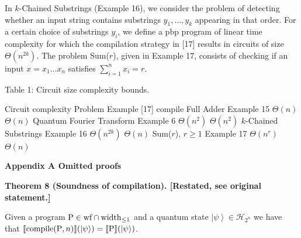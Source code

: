  
 
In $k$-Chained Substrings (Example 16), we consider the problem of detecting whether an input string contains substrings $y_{1},\dots,y_{k}$ appearing in that order. For a certain choice of substrings $y_{i}$, we define a pbp program of linear time complexity for which the compilation strategy in [17] results in circuits of size $\Theta(n^{2k})$. The problem Sum($r$), given in Example 17, consists of checking if an input $x=x_{1}\dots x_{n}$ satisfies $\sum_{i=1}^{n}x_{i}=r$.\par
 
 
 
Table 1: Circuit size complexity bounds.\par
     Circuit complexity     Problem   Example     [17]     compile     Full Adder   Example 15     $\Theta(n)$     $\Theta(n)$     Quantum Fourier Transform   Example 6     $\Theta(n^{2})$     $\Theta(n^{2})$      $k$-Chained Substrings   Example 16     $\Theta(n^{2k})$     $\Theta(n)$     Sum($r$), $r\geq 1$    Example 17     $\Theta(n^{r})$     $\Theta(n)$      
 
 


 
\par\medskip\noindent\textbf{Appendix A Omitted proofs}\par
 
 
 
\par\medskip\noindent\textbf{Theorem 8 (Soundness of compilation). [Restated, see original statement.]}\par
 
 
Given a program $\mathrm{P}\in\textnormal{{wf}}\cap\textnormal{{width}}_{\leq 1}$ and a quantum state $\left|\psi\right\rangle\in\mathcal{H}_{2^{n}}$ we have that $\llbracket\textnormal{{compile}}{}(\mathrm{P},n)\rrbracket(\left|\psi\right%
\rangle)=\llbracket\mathrm{P}\rrbracket(\left|\psi\right\rangle)$.\par
 
 
 
 
